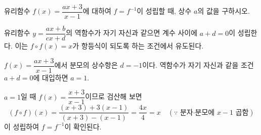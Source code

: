 \documentclass[10pt]{article}
\begin{document}
\begin{dmproblem}
유리함수 $f(x) = \dfrac{ax + 3}{x - 1}$에 대하여 $f = f^{-1}$이 성립할 때, 상수 $a$의 값을 구하시오.
\end{dmproblem}

\begin{dmapproach}
유리함수 $y = \dfrac{ax + b}{cx + d}$의 역함수가 자기 자신과 같으면 계수 사이에 $a + d = 0$이 성립한다. 이는 $f \circ f(x) = x$가 항등식이 되도록 하는 조건에서 유도된다.
\end{dmapproach}

\begin{dmsolution}
$f(x) = \dfrac{ax + 3}{x - 1}$에서 분모의 상수항은 $d = -1$이다. 역함수가 자기 자신과 같을 조건 $a + d = 0$에 대입하면 $a = 1$.

$a = 1$일 때 $f(x) = \dfrac{x + 3}{x - 1}$이므로 검산해 보면
\begin{equation*}
  (f \circ f)(x) = \frac{(x + 3) + 3(x - 1)}{(x + 3) - (x - 1)} = \frac{4x}{4} = x \quad(\because\text{ 분자·분모에 } x-1 \text{ 곱함})
\end{equation*}
이 성립하여 $f = f^{-1}$이 확인된다.
\end{dmsolution}

\dmchecktitle



\newpage





\end{document}
